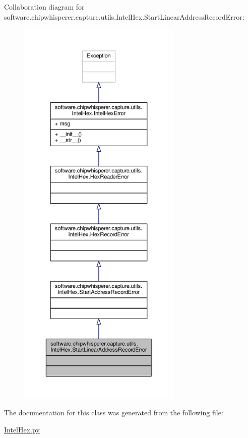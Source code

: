 Collaboration diagram for software.\+chipwhisperer.\+capture.\+utils.\+Intel\+Hex.\+Start\+Linear\+Address\+Record\+Error\+:\nopagebreak
\begin{figure}[H]
\begin{center}
\leavevmode
\includegraphics[height=550pt]{d3/d85/classsoftware_1_1chipwhisperer_1_1capture_1_1utils_1_1IntelHex_1_1StartLinearAddressRecordError__coll__graph}
\end{center}
\end{figure}


The documentation for this class was generated from the following file\+:\begin{DoxyCompactItemize}
\item 
\hyperlink{IntelHex_8py}{Intel\+Hex.\+py}\end{DoxyCompactItemize}
